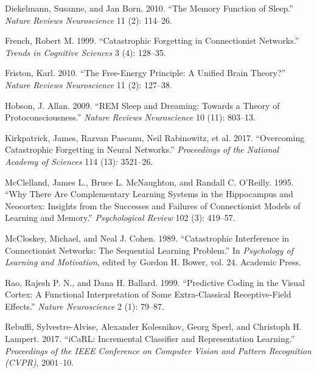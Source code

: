 \documentclass[
]{article}
\newlength{\cslhangindent}
\newenvironment{CSLReferences}[2] %
 {\begin{list}{}{%
  \setlength{\itemindent}{0pt}
  \setlength{\leftmargin}{0pt}
  \setlength{\parsep}{0pt}
  \ifodd #1
   \setlength{\leftmargin}{\cslhangindent}
   \setlength{\itemindent}{-1\cslhangindent}
  \fi
  \setlength{\itemsep}{#2\baselineskip}}}
 {\end{list}}
\begin{document}
\protect{}\label{refs}
\begin{CSLReferences}{1}{1}
Diekelmann, Susanne, and Jan Born. 2010. {``The Memory Function of
Sleep.''} \emph{Nature Reviews Neuroscience} 11 (2): 114--26.

French, Robert M. 1999. {``Catastrophic Forgetting in Connectionist
Networks.''} \emph{Trends in Cognitive Sciences} 3 (4): 128--35.

Friston, Karl. 2010. {``The Free-Energy Principle: A Unified Brain
Theory?''} \emph{Nature Reviews Neuroscience} 11 (2): 127--38.

Hobson, J. Allan. 2009. {``{REM} Sleep and Dreaming: Towards a Theory of
Protoconsciousness.''} \emph{Nature Reviews Neuroscience} 10 (11):
803--13.

{Kirkpatrick, James, Razvan Pascanu, Neil Rabinowitz, et al.} 2017.
{``Overcoming Catastrophic Forgetting in Neural Networks.''}
\emph{Proceedings of the National Academy of Sciences} 114 (13):
3521--26.

McClelland, James L., Bruce L. McNaughton, and Randall C. O'Reilly.
1995. {``Why There Are Complementary Learning Systems in the Hippocampus
and Neocortex: Insights from the Successes and Failures of Connectionist
Models of Learning and Memory.''} \emph{Psychological Review} 102 (3):
419--57.

McCloskey, Michael, and Neal J. Cohen. 1989. {``Catastrophic
Interference in Connectionist Networks: {The} Sequential Learning
Problem.''} In \emph{Psychology of Learning and Motivation}, edited by
Gordon H. Bower, vol. 24. Academic Press.

Rao, Rajesh P. N., and Dana H. Ballard. 1999. {``Predictive Coding in
the Visual Cortex: A Functional Interpretation of Some Extra-Classical
Receptive-Field Effects.''} \emph{Nature Neuroscience} 2 (1): 79--87.

Rebuffi, Sylvestre-Alvise, Alexander Kolesnikov, Georg Sperl, and
Christoph H. Lampert. 2017. {``{iCaRL}: Incremental Classifier and
Representation Learning.''} \emph{Proceedings of the IEEE Conference on
Computer Vision and Pattern Recognition (CVPR)}, 2001--10.


\end{CSLReferences}
\end{document}
